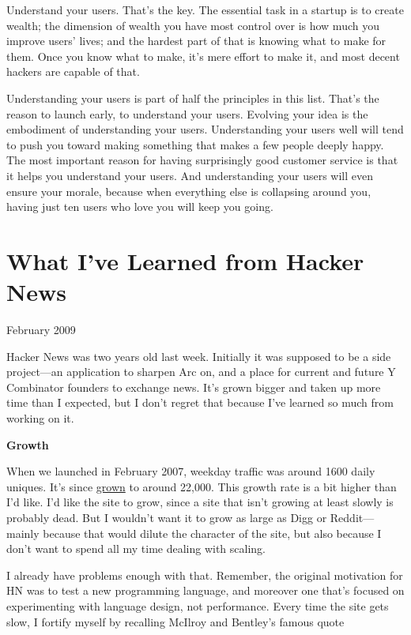 \documentclass[12pt]{book}
\begin{document}
Understand your users. That's the key. The essential task in a startup
is to create wealth; the dimension of wealth you have most control over
is how much you improve users' lives; and the hardest part of that is
knowing what to make for them. Once you know what to make, it's mere
effort to make it, and most decent hackers are capable of that.

Understanding your users is part of half the principles in this list.
That's the reason to launch early, to understand your users. Evolving
your idea is the embodiment of understanding your users. Understanding
your users well will tend to push you toward making something that makes
a few people deeply happy. The most important reason for having
surprisingly good customer service is that it helps you understand your
users. And understanding your users will even ensure your morale,
because when everything else is collapsing around you, having just ten
users who love you will keep you going.
\chapter{What I've Learned from Hacker News}

February 2009

Hacker News was two years old last week. Initially it was supposed to be
a side project---an application to sharpen Arc on, and a place for
current and future Y Combinator founders to exchange news. It's grown
bigger and taken up more time than I expected, but I don't regret that
because I've learned so much from working on it.

\textbf{Growth}

When we launched in February 2007, weekday traffic was around 1600 daily
uniques. It's since
\href{http://ycombinator.com/images/2yeartraffic.png}{grown} to around
22,000. This growth rate is a bit higher than I'd like. I'd like the
site to grow, since a site that isn't growing at least slowly is
probably dead. But I wouldn't want it to grow as large as Digg or
Reddit---mainly because that would dilute the character of the site, but
also because I don't want to spend all my time dealing with scaling.

I already have problems enough with that. Remember, the original
motivation for HN was to test a new programming language, and moreover
one that's focused on experimenting with language design, not
performance. Every time the site gets slow, I fortify myself by
recalling McIlroy and Bentley's famous quote
\end{document}
